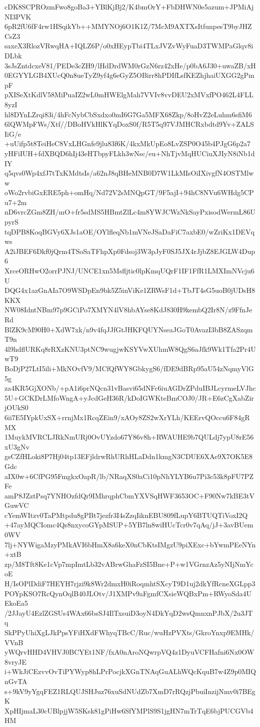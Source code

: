 cDK8SCPROzmFwo8goBa3+YBlKjBj2/K4bmOrY+FbDHWN0e5azum+JPMiAjNI3PVK
6pR2fU6fF4rw1HSqikYb++MMYNOj6O1K1Z/7McM9AXTXsItfunpesT9byJHZCsZ3
saxeX3RlozVRwqHA+IQLZ6P/o0xHEypTbi4TLxJVZvWyFuaD3TWMPaGlqv8iDLbk
3sJsZntdcxeV81/PEDe3cZH9/lHdDrdWM0rGzN6rz42xHe/p0bA6J30+uwaZB/xH
0EGYYLGB4XUcQ0n8ueTyZ9yf4g6eGyZ5OBirr8hPDIfLsfKEZhjhaiUXGG2gPmpF
pXISeXtKdlV58MiPuaIZ2wL0mHWElgMah7VVIv8vvDEU2xMVxfPO462L4FLL8yzI
hl8DYnLZrqi83i/4hFcNybCbSxdxo0mI6G7Ga5MFX68Zkp/8oHvZ2eLuhm6sfiM6
6lQWMpFWs/Xtf//DBoHVkHlKYqDoxS0f/R5T5q97VJMHCRxbdtd9Yv+ZALSIiG/e
+uUifp5t8TeiHeC8VxLHGnfe9jlu83f6K/4kxMkUpEo8LvZSP0O45b4PJgG6p2a7
yHFiIUH+fdXBQD6hIj43eHTbpyFLkh3wNsc/eu+NhTjvMqHUCiuXJIyN8iNb1dIY
q5qvs0Wp4xfJ7tTxKMdtsIs/a62nJ8qBHeMNB0D7W1LkMIsOiIXivgfN4OSTMlww
oWo2rvbiGxERE5ph+omHq/Nd72V2sMNQpGT/9F5ajI+94hC8NVu6WHdg5CPu7+2m
nD6vrcZGm8ZH/mO+fr5sdMS5HBmtZlLc4m8YWJCWzNkSayPxisodWermL86UpyrS
tqDPB8KoqBGVy6XJs1aOE/OYlfleqNb1mVNeJSaDaFiC7axbE0/wZriKx1DEVqws
A2iJBEF6Dkf0jQrm4TSoSaTFhpXp0Fdsoj3W3pJyF0SJ5JX4rJjbZ8EJGLW4Dup6
XrceORHwO2orrPJNJ/UNCE1xn5Msfljtic0lpKmqUQrF1IF1FfR1LMXImNVcju6U
DQG4x1azGnAIa7O9WSDpEn9bk5Z5inViKe1ZRWsF1d+TbJT4sG5uoB0jUDsH8KKX
NW08IdntNBm97p9GCiPo7XMYN4lV8hbAYse8KdJ830H9kembQ2Ir8N/z9FfnJeRd
BlZK9cM90H0+XdW7xk/n9v4fqJJfGtJHKFQUYNseaJGoT0AvazI3bB8ZASzqmT9n
4l9hdflURKq8rRXzKNU3ptNC9wugjwKSYVwXUhmW8QgS6aJfk9Wk1Tfa2Pr4UwT9
BoDjP27LtI5ili+MkNOvfV9/MCfQfWY8GbkygS6/fDE9dBRp95aU54zNqmyVlG5g
za4KR5GjXONb/+pA1i6prNQcn31vBasvi65dNFc6iuAGDrZPduIBJLcyrmeLVJhc
5U+GCKDrLMfoWngA+yJcdGeH36R/kDoIGWKteBmCOJ0/JR+E6zCgXabZirjOUkS0
6ii7E5IYpkUxSX+rrnjMx1RcqZEin9/xAOy8ZS2wXrYLh/KEErvQOccu6F84gRMX
1MuykMVRCLJRkNmURj0OvUYzdo67Y86v8h+RWAUHE9b7QULdj7ypU8rE56xU3gNv
gsCZfHLoki8P7Hj04tp13EFjldrwRhURhHLaDdn1kmgN3CDUE6XAe9X7OK5E8Gdc
aIX0w+6CfPG95FmgkxOapR/lb/NRaqXS0aCi10pNhYLYB6u7Pi3c53k8pFU7PZFe
amP8JZztPsq7YNHOzfdQr9IMhrqphCbmYXVSqHWF3653OC+F90Nw7kBE3tVGuwVC
cYemWItzv0TaPMtpdu8gPBt7jezfr3I4sZzqIiknEBU809fLupY6BTUQTiVoxI2Q
+47ayMQCIomc4Qs8nxycoGYpMSUP+5YB7ln8wiHUcTcr0v7qAq/jJ+3avBUem0WV
7lj+NYWigaMzyPMkAVI6bHmX8a6keX0nCbKtsIMgzU9piXExc+bYwmPEeNYn+xtB
zp/M8Tft8Ke1cVp7mpImtLb32vABrwGhaFzSI5Bne+P+w1VGrnzAz5yNIjNmYcoE
H/IsOPlDdiF7HEYH7rjzi9k8Wr2dmxH0iRoqmhtSXcyT9D1uj2dkYfRcneXGLpp3
POYpKSO7RcQynOqlB40JLOtv/J1XMPv9aFgmfCXsieWQBxPm+RWyoSda4UEkoEa5
/2JJayU4EzlZGSUs4WAx66bsSJ4IlTxsuiD3oyN4DkYqD2wsQmnxnPJbX/2u3JTq
SkPPyUhiXgLJkPpsYFiHXdFWhyqTBcC/Ruc/wuHzPVXts/GkroYnxp9EMHk/VVnB
yWQrvHHD4VHVJ0BCYEt1NF/fxA0nAroNQwrpVQ4z1DyuVCFHafni6Nx0OW8vryJE
i+WkJiCEzvvOvTiPYWyp8hLPrPocjkXGnTNAqGuALhWQcKquB7w4Z9p0MIQnGvTA
s+9kV9yYgqFEZ1RLQUJSHJuz76xuSdNUdZb7XmD7rRQzjPbuiInzijNmv0i7BEgK
XpHIjmaL30cUBlpjjW5SKsk81gPiHw6SfYMPlS9S1jgHN7mTrTqE6bjPUCGVb4HM
